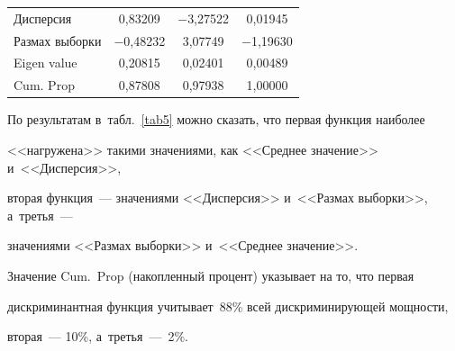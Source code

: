 \begin{table}
\begin{center}
\begin{tabular}{|l|c|c|c|}
Дисперсия & 0,83209 & $-$3,27522\hphantom{$-$} & 0,01945 \\

Размах выборки & $-$0,48232\hphantom{$-$} & 3,07749 & $-$1,19630\hphantom{$-$}\\

Eigen value & 0,20815 & 0,02401 & 0,00489 \\

Cum. Prop & 0,87808 & 0,97938 & 1,00000\\ 

\hline

\end{tabular}

\end{center}

\end{table}



\pagebreak



По результатам в~табл.~\ref{tab5} можно сказать, что первая функция наиболее 

<<нагружена>> такими значениями, как <<Среднее значение>> и~<<Дисперсия>>, 

вторая функция~--- значениями <<Дисперсия>> и~<<Размах выборки>>, а~третья~--- 

значениями <<Размах выборки>> и~<<Среднее значение>>.



    Значение Cum.~Prop (накопленный процент) указывает на то, что первая 

    дискриминантная функция учитывает~88\% всей дискриминирующей мощности,

        вторая~--- 10\%, а~третья~---~2\%.

    

